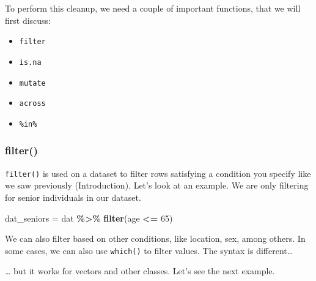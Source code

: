 \documentclass[
]{book}
\newenvironment{Shaded}{\begin{snugshade}}{\end{snugshade}}
\newcommand{\DecValTok}[1]{\textcolor[rgb]{0.00,0.00,0.81}{#1}}
\newcommand{\FunctionTok}[1]{\textcolor[rgb]{0.13,0.29,0.53}{\textbf{#1}}}
\newcommand{\NormalTok}[1]{#1}
\newcommand{\OtherTok}[1]{\textcolor[rgb]{0.56,0.35,0.01}{#1}}
\newcommand{\SpecialCharTok}[1]{\textcolor[rgb]{0.81,0.36,0.00}{\textbf{#1}}}
\providecommand{\tightlist}{%
  \setlength{\itemsep}{0pt}\setlength{\parskip}{0pt}}
\begin{document}
To perform this cleanup, we need a couple of important functions, that we will first discuss:

\begin{itemize}
\tightlist
\item
  \texttt{filter}
\item
  \texttt{is.na}
\item
  \texttt{mutate}
\item
  \texttt{across}
\item
  \texttt{\%in\%}
\end{itemize}

\hypertarget{filter}{%
\subsubsection{filter()}\label{filter}}

\texttt{filter()} is used on a dataset to filter rows satisfying a condition you specify like we saw previously (Introduction).
Let's look at an example. We are only filtering for senior individuals in our dataset.

\begin{Shaded}
\begin{Highlighting}[]
\NormalTok{dat\_seniors }\OtherTok{=}\NormalTok{ dat }\SpecialCharTok{\%\textgreater{}\%}
  \FunctionTok{filter}\NormalTok{(age }\SpecialCharTok{\textless{}=} \DecValTok{65}\NormalTok{)}
\end{Highlighting}
\end{Shaded}

We can also filter based on other conditions, like location, sex, among others.
In some cases, we can also use \texttt{which()} to filter values. The syntax is different\ldots{}

\begin{Shaded}
\end{Shaded}

\ldots{} but it works for vectors and other classes. Let's see the next example.
\end{document}
